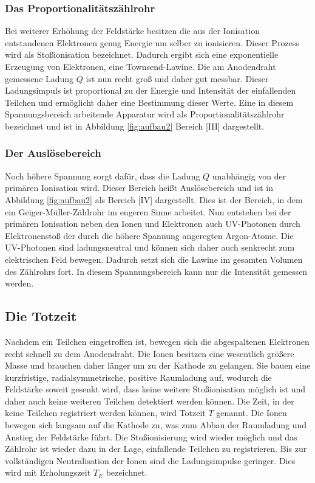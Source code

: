     \subsubsection{Das Proportionalitätszählrohr}
      Bei weiterer Erhöhung der Feldstärke besitzen die aus der Ionisation entstandenen Elektronen
      genug Energie um selber zu ionisieren. Dieser Prozess wird als Stoßionisation bezeichnet.
      Dadurch ergibt sich eine exponentielle Erzeugung von Elektronen, eine Townsend-Lawine. Die am
      Anodendraht gemessene Ladung $Q$ ist nun recht groß und daher gut messbar. Dieser Ladungsimpuls
      ist proportional zu der Energie und Intensität der einfallenden Teilchen und ermöglicht daher
      eine Bestimmung dieser Werte. Eine in diesem Spannungsbereich arbeitende Apparatur wird als
      Proportionalitätszählrohr bezeichnet und ist in Abbildung \ref{fig:aufbau2} Bereich [III]
      dargestellt.
    \subsubsection{Der Auslösebereich}
      Noch höhere Spannung sorgt dafür, dass die Ladung $Q$ unabhängig von der primären Ionisation
      wird. Dieser Bereich heißt Auslösebereich und ist in Abbildung \ref{fig:aufbau2} als Bereich
      [IV] dargestellt. Dies ist der Bereich, in dem ein Geiger-Müller-Zählrohr im engeren Sinne
      arbeitet. Nun entstehen bei der primären Ionisation neben den Ionen und Elektronen auch
      UV-Photonen durch Elektronenstoß der durch die höhere Spannung angeregten Argon-Atome. Die
      UV-Photonen sind ladungsneutral und können sich daher auch senkrecht zum elektrischen Feld
      bewegen. Dadurch setzt sich die Lawine im gesamten Volumen des Zählrohrs fort. In diesem
      Spannungsbereich kann nur die Intensität gemessen werden.
  \subsection{Die Totzeit}
    Nachdem ein Teilchen eingetroffen ist, bewegen sich die abgespaltenen Elektronen recht schnell zu
    dem Anodendraht. Die Ionen besitzen eine wesentlich größere Masse und brauchen daher länger um zu
    der Kathode zu gelangen. Sie bauen eine kurzfristige, radialsymmetrische, positive Raumladung auf,
    wodurch die Feldstärke soweit gesenkt wird, dass keine weitere Stoßionisation möglich ist und
    daher auch keine weiteren Teilchen detektiert werden können. Die Zeit, in der keine Teilchen
    registriert werden können, wird Totzeit $T$ genannt. Die Ionen bewegen sich langsam auf die
    Kathode zu, was zum Abbau der Raumladung und Anstieg der Feldstärke führt. Die Stoßionisierung
    wird wieder möglich und das Zählrohr ist wieder dazu in der Lage, einfallende Teilchen zu
    registrieren. Bis zur vollständigen Neutralisation der Ionen sind die Ladungsimpulse geringer.
    Dies wird mit Erholungszeit $T_{E}$ bezeichnet.
